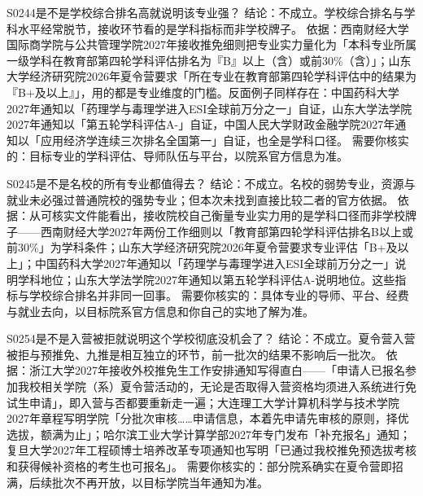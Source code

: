 \begin{qa}{S0244}{是不是学校综合排名高就说明该专业强？}
结论：不成立。学校综合排名与学科水平经常脱节，接收环节看的是学科指标而非学校牌子。
依据：西南财经大学国际商学院与公共管理学院2027年接收推免细则把专业实力量化为「本科专业所属一级学科在教育部第四轮学科评估排名为『B』以上（含）或前30\%（含）」；山东大学经济研究院2026年夏令营要求「所在专业在教育部第四轮学科评估中的结果为『B+及以上』」，用的都是专业维度的门槛。反面例子同样存在：中国药科大学2027年通知以「药理学与毒理学进入ESI全球前万分之一」自证，山东大学法学院2027年通知以「第五轮学科评估A-」自证，中国人民大学财政金融学院2027年通知以「应用经济学连续三次排名全国第一」自证，也全是学科口径。
需要你核实的：目标专业的学科评估、导师队伍与平台，以院系官方信息为准。
\end{qa}

\begin{qa}{S0245}{是不是名校的所有专业都值得去？}
结论：不成立。名校的弱势专业，资源与就业未必强过普通院校的强势专业；但本次未找到直接比较二者的官方依据。
依据：从可核实文件能看出，接收院校自己衡量专业实力用的是学科口径而非学校牌子——西南财经大学2027年两份工作细则以「教育部第四轮学科评估排名B以上或前30\%」为学科条件；山东大学经济研究院2026年夏令营要求专业评估「B+及以上」；中国药科大学2027年通知以「药理学与毒理学进入ESI全球前万分之一」说明学科地位；山东大学法学院2027年通知以第五轮学科评估A-说明地位。这些指标与学校综合排名并非同一回事。
需要你核实的：具体专业的导师、平台、经费与就业去向，以目标院系官方信息和你自己的实地了解为准。
\end{qa}

\begin{qa}{S0254}{是不是入营被拒就说明这个学校彻底没机会了？}
结论：不成立。夏令营入营被拒与预推免、九推是相互独立的环节，前一批次的结果不影响后一批次。
依据：浙江大学2027年接收外校推免生工作安排通知写得直白——「申请人已报名参加我校相关学院（系）夏令营活动的，无论是否取得入营资格均须进入系统进行免试生申请」，即入营与否都要重新走一遍；大连理工大学计算机科学与技术学院2027年章程写明学院「分批次审核……申请信息，本着先申请先审核的原则，择优选拔，额满为止」；哈尔滨工业大学计算学部2027年专门发布「补充报名」通知；复旦大学2027年工程硕博士培养改革专项通知也写明「已通过我校推免预选拔考核和获得候补资格的考生也可报名」。
需要你核实的：部分院系确实在夏令营即招满，后续批次不再开放，以目标学院当年通知为准。
\end{qa}

